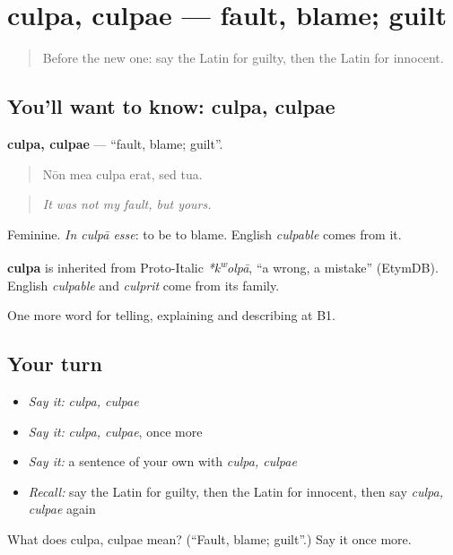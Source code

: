 \section[culpa, culpae]{culpa, culpae — fault, blame; guilt}

\label{lesson:LA-C311-culpa}



\begin{quote}
Before the new one: say the Latin for guilty, then the Latin for innocent.
\end{quote}

\subsection*{You'll want to know: culpa, culpae}
\textbf{culpa, culpae} — \textquotedblleft{}fault, blame; guilt\textquotedblright{}.

\begin{quote}
Nōn mea culpa erat, sed tua.
\end{quote}

\begin{quote}
\emph{It was not my fault, but yours.}
\end{quote}

Feminine. \emph{In culpā esse}: to be to blame. English \emph{culpable} comes from it.

\begin{cousinweb}
\textbf{culpa} is inherited from Proto-Italic \emph{*k\textsuperscript{w}olpā}, \textquotedblleft{}a wrong, a mistake\textquotedblright{} (EtymDB). English \emph{culpable} and \emph{culprit} come from its family.
\end{cousinweb}

\begin{grammarlens}[title={What you've built}]
One more word for telling, explaining and describing at B1.
\end{grammarlens}

\subsection*{Your turn}
\begin{itemize}
\raggedright
  \item \emph{Say it:} \emph{culpa, culpae}
  \item \emph{Say it:} \emph{culpa, culpae}, once more
  \item \emph{Say it:} a sentence of your own with \emph{culpa, culpae}
  \item \emph{Recall:} say the Latin for guilty, then the Latin for innocent, then say \emph{culpa, culpae} again
\end{itemize}

\begin{tcolorbox}[breakable,colback=teal!4,colframe=teal!35!black,title={Before you move on}]
What does culpa, culpae mean? (\textquotedblleft{}Fault, blame; guilt\textquotedblright{}.) Say it once more.
\end{tcolorbox}

